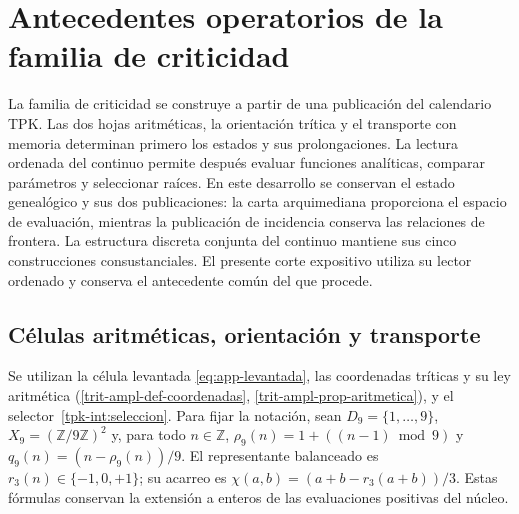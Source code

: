 \providecommand{\ZZ}{\mathbb Z}
\providecommand{\RR}{\mathbb R}
\providecommand{\FF}{\mathbb F}
\providecommand{\APP}{\mathrm{APP}}
\providecommand{\TPK}{\mathrm{TPK}}
\providecommand{\TRIT}{\{-1,0,+1\}}

\section{Antecedentes operatorios de la familia de criticidad}
\label{hmtfg:antecedentes-operatorios}

La familia de criticidad se construye a partir de una publicación del
calendario TPK. Las dos hojas aritméticas, la orientación trítica y el
transporte con memoria determinan primero los estados y sus prolongaciones.
La lectura ordenada del continuo permite después evaluar funciones
analíticas, comparar parámetros y seleccionar raíces. En este desarrollo
se conservan el estado genealógico y sus dos publicaciones: la carta
arquimediana proporciona el espacio de evaluación, mientras la publicación
de incidencia conserva las relaciones de frontera. La estructura discreta
conjunta del continuo mantiene sus cinco construcciones consustanciales.
El presente corte expositivo utiliza su lector ordenado y conserva el
antecedente común del que procede.

\subsection{Células aritméticas, orientación y transporte}
\label{hmtfg:app-trit-transporte}

Se utilizan la célula levantada \eqref{eq:app-levantada}, las coordenadas tríticas y su ley aritmética (\ref{trit-ampl-def-coordenadas}, \ref{trit-ampl-prop-aritmetica}), y el selector~\ref{tpk-int:seleccion}. Para fijar la notación, sean $D_9=\{1,\ldots,9\}$, $X_9=(\mathbb Z/9\mathbb Z)^2$ y, para todo $n\in\mathbb Z$, $\rho_9(n)=1+((n-1)\bmod9)$ y $q_9(n)=(n-\rho_9(n))/9$. El representante balanceado es $r_3(n)\in\{-1,0,+1\}$; su acarreo es $\chi(a,b)=(a+b-r_3(a+b))/3$. Estas fórmulas conservan la extensión a enteros de las evaluaciones positivas del núcleo.

